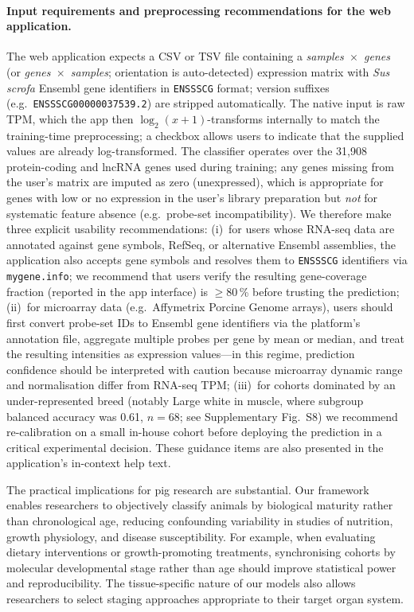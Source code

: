 \documentclass[10pt,a4paper]{article}
\begin{document}
\paragraph{Input requirements and preprocessing recommendations for the web application.}
The web application expects a CSV or TSV file containing a \emph{samples~$\times$~genes} (or \emph{genes~$\times$~samples}; orientation is auto-detected) expression matrix with \textit{Sus scrofa} Ensembl gene identifiers in \texttt{ENSSSCG} format; version suffixes (e.g.\ \texttt{ENSSSCG00000037539.2}) are stripped automatically. The native input is raw TPM, which the app then $\log_2(x+1)$-transforms internally to match the training-time preprocessing; a checkbox allows users to indicate that the supplied values are already log-transformed. The classifier operates over the 31{,}908 protein-coding and lncRNA genes used during training; any genes missing from the user's matrix are imputed as zero (unexpressed), which is appropriate for genes with low or no expression in the user's library preparation but \emph{not} for systematic feature absence (e.g.\ probe-set incompatibility). We therefore make three explicit usability recommendations: (i)~for users whose RNA-seq data are annotated against gene symbols, RefSeq, or alternative Ensembl assemblies, the application also accepts gene symbols and resolves them to \texttt{ENSSSCG} identifiers via \texttt{mygene.info}; we recommend that users verify the resulting gene-coverage fraction (reported in the app interface) is $\geq$80\,\% before trusting the prediction; (ii)~for microarray data (e.g.\ Affymetrix Porcine Genome arrays), users should first convert probe-set IDs to Ensembl gene identifiers via the platform's annotation file, aggregate multiple probes per gene by mean or median, and treat the resulting intensities as expression values---in this regime, prediction confidence should be interpreted with caution because microarray dynamic range and normalisation differ from RNA-seq TPM; (iii)~for cohorts dominated by an under-represented breed (notably Large white in muscle, where subgroup balanced accuracy was 0.61, $n=68$; see Supplementary Fig.~S8) we recommend re-calibration on a small in-house cohort before deploying the prediction in a critical experimental decision. These guidance items are also presented in the application's in-context help text.

The practical implications for pig research are substantial. Our framework enables researchers to objectively classify animals by biological maturity rather than chronological age, reducing confounding variability in studies of nutrition, growth physiology, and disease susceptibility. For example, when evaluating dietary interventions or growth-promoting treatments, synchronising cohorts by molecular developmental stage rather than age should improve statistical power and reproducibility. The tissue-specific nature of our models also allows researchers to select staging approaches appropriate to their target organ system.
\end{document}
